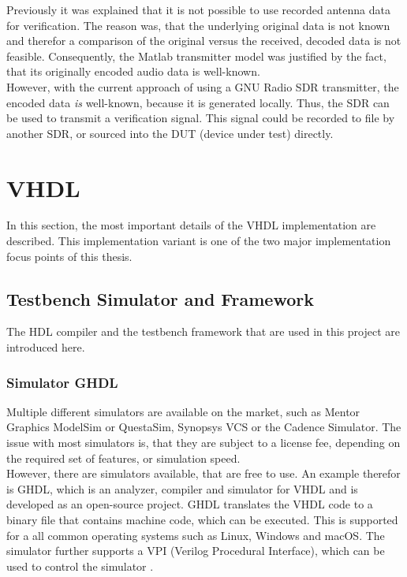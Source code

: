 Previously it was explained that it is not possible to use recorded antenna data for verification.
The reason was, that the underlying original data is not known and therefor a comparison of the original versus the received, decoded data is not feasible.
Consequently, the Matlab transmitter model was justified by the fact, that its originally encoded audio data is well-known.\\

However, with the current approach of using a GNU Radio SDR transmitter, the encoded data \textit{is} well-known, because it is generated locally.
Thus, the SDR can be used to transmit a verification signal.
This signal could be recorded to file by another SDR, or sourced into the DUT (device under test) directly.


\section{VHDL}

In this section, the most important details of the VHDL implementation are described.
This implementation variant is one of the two major implementation focus points of this thesis.

\subsection{Testbench Simulator and Framework}

The HDL compiler and the testbench framework that are used in this project are introduced here.

\subsubsection{Simulator GHDL}

Multiple different simulators are available on the market, such as Mentor Graphics ModelSim or QuestaSim, Synopsys VCS or the Cadence Simulator.
The issue with most simulators is, that they are subject to a license fee, depending on the required set of features, or simulation speed.\\

However, there are simulators available, that are free to use.
An example therefor is GHDL, which is an analyzer, compiler and simulator for VHDL and is developed as an open-source project.
GHDL translates the VHDL code to a binary file that contains machine code, which can be executed.
This is supported for a all common operating systems such as Linux, Windows and macOS.
The simulator further supports a VPI (Verilog Procedural Interface), which can be used to control the simulator \cite{GHDLDoc}.


